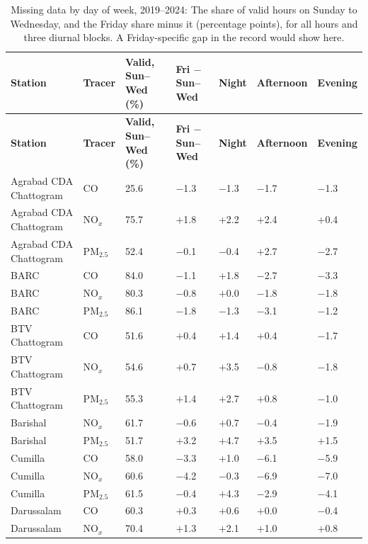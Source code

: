 \begingroup\footnotesize
\begin{longtable}{L{3.2cm} L{1.2cm} C{1.6cm} C{1.6cm} C{1.6cm} C{1.6cm} C{1.6cm}}
\caption{Missing data by day of week, 2019--2024: The share of valid hours on Sunday to Wednesday, and the Friday share minus it (percentage points), for all hours and three diurnal blocks. A Friday-specific gap in the record would show here.}\label{tab:s-missing}\\
\toprule
\textbf{Station} & \textbf{Tracer} & \textbf{Valid, Sun--Wed (\%)} & \textbf{Fri $-$ Sun--Wed} & \textbf{Night} & \textbf{Afternoon} & \textbf{Evening} \\
\midrule\endfirsthead
\toprule
\textbf{Station} & \textbf{Tracer} & \textbf{Valid, Sun--Wed (\%)} & \textbf{Fri $-$ Sun--Wed} & \textbf{Night} & \textbf{Afternoon} & \textbf{Evening} \\
\midrule\endhead
\bottomrule\endfoot
Agrabad CDA Chattogram & CO & 25.6 & $-$1.3 & $-$1.3 & $-$1.7 & $-$1.3 \\
Agrabad CDA Chattogram & NO$_x$ & 75.7 & $+$1.8 & $+$2.2 & $+$2.4 & $+$0.4 \\
Agrabad CDA Chattogram & PM$_{2.5}$ & 52.4 & $-$0.1 & $-$0.4 & $+$2.7 & $-$2.7 \\
BARC & CO & 84.0 & $-$1.1 & $+$1.8 & $-$2.7 & $-$3.3 \\
BARC & NO$_x$ & 80.3 & $-$0.8 & $+$0.0 & $-$1.8 & $-$1.8 \\
BARC & PM$_{2.5}$ & 86.1 & $-$1.8 & $-$1.3 & $-$3.1 & $-$1.2 \\
BTV Chattogram & CO & 51.6 & $+$0.4 & $+$1.4 & $+$0.4 & $-$1.7 \\
BTV Chattogram & NO$_x$ & 54.6 & $+$0.7 & $+$3.5 & $-$0.8 & $-$1.8 \\
BTV Chattogram & PM$_{2.5}$ & 55.3 & $+$1.4 & $+$2.7 & $+$0.8 & $-$1.0 \\
Barishal & NO$_x$ & 61.7 & $-$0.6 & $+$0.7 & $-$0.4 & $-$1.9 \\
Barishal & PM$_{2.5}$ & 51.7 & $+$3.2 & $+$4.7 & $+$3.5 & $+$1.5 \\
Cumilla & CO & 58.0 & $-$3.3 & $+$1.0 & $-$6.1 & $-$5.9 \\
Cumilla & NO$_x$ & 60.6 & $-$4.2 & $-$0.3 & $-$6.9 & $-$7.0 \\
Cumilla & PM$_{2.5}$ & 61.5 & $-$0.4 & $+$4.3 & $-$2.9 & $-$4.1 \\
Darussalam & CO & 60.3 & $+$0.3 & $+$0.6 & $+$0.0 & $-$0.4 \\
Darussalam & NO$_x$ & 70.4 & $+$1.3 & $+$2.1 & $+$1.0 & $+$0.8 \\

\end{longtable}
